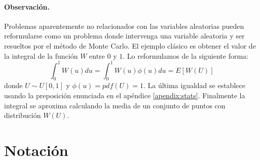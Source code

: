 \paragraph{Observaci\'on.} Problemas aparentemente no relacionados con las 
variables aleatorias pueden reformularse como un problema donde intervenga
una variable aleatoria y ser resueltos por el m\'etodo de Monte Carlo. El 
ejemplo cl\'asico es obtener el valor de la integral de la funci\'on $W$ entre 
$0$ y $1$. Lo reformulamos de la siguiente forma:
\begin{displaymath}
\int_{0}^{1} W(u) du = \int_{0}^{1} W(u) \phi(u) du = E[W(U)]
\end{displaymath}
donde $U \sim U[0,1]$ y $\phi(u) = pdf(U) = 1$. La \'ultima igualdad se establece 
usando la preposici\'on enunciada en el ap\'endice \ref{apendix:stats}. 
Finalmente la integral se aproxima calculando la media de un conjunto de puntos 
con distribuci\'on $W(U)$.



\section{Notaci\'on}

